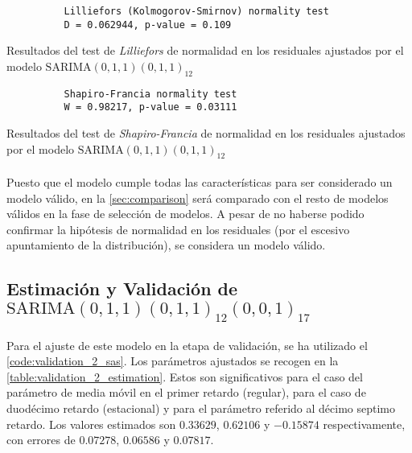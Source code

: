 \documentclass[a4paper, spanish]{article}
\begin{document}
      \begin{table}[htb!]
        \begin{Verbatim}
          Lilliefors (Kolmogorov-Smirnov) normality test
          D = 0.062944, p-value = 0.109
        \end{Verbatim}
        \caption{Resultados del test de \emph{Lilliefors} de normalidad en los residuales ajustados por el modelo $\text{SARIMA}(0, 1, 1)(0, 1, 1)_{12}$}
        \label{result:validation_1_lilliefors}
      \end{table}

      \begin{table}[htb!]
        \begin{Verbatim}
          Shapiro-Francia normality test
          W = 0.98217, p-value = 0.03111
        \end{Verbatim}
        \caption{Resultados del test de \emph{Shapiro-Francia} de normalidad en los residuales ajustados por el modelo $\text{SARIMA}(0, 1, 1)(0, 1, 1)_{12}$}
        \label{result:validation_1_sf}
      \end{table}

      \paragraph{}
      Puesto que el modelo cumple todas las características para ser considerado un modelo válido, en la \autoref{sec:comparison} será comparado con el resto de modelos válidos en la fase de selección de modelos. A pesar de no haberse podido confirmar la hipótesis de normalidad en los residuales (por el escesivo apuntamiento de la distribución), se considera un modelo válido.

    \subsection{Estimación y Validación de \textbf{$\text{SARIMA}(0, 1, 1)(0, 1, 1)_{12}(0, 0, 1)_{17}$}}
    \label{sec:fitting_2}

      \paragraph{}
      Para el ajuste de este modelo en la etapa de validación, se ha utilizado el \autoref{code:validation_2_sas}. Los parámetros ajustados se recogen en la \autoref{table:validation_2_estimation}. Estos son significativos para el caso del parámetro de media móvil en el primer retardo (regular), para el caso de duodécimo retardo (estacional) y para el parámetro referido al décimo septimo retardo. Los valores estimados son $0.33629$, $0.62106$ y $-0.15874$ respectivamente, con errores de $0.07278$, $0.06586$ y $0.07817$.
\end{document}
